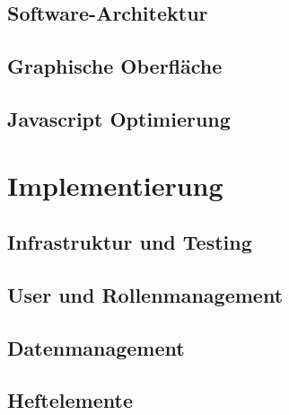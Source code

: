 \documentclass[12pt]{article}
\begin{document}
\subsection{Software-Architektur}
\label{subsec:softwarearchitektur}


\newpage

\subsection{Graphische Oberfläche}
\label{subsec:graphischeoberflaeche}


\newpage

\subsection{Javascript Optimierung}
\label{subsec:javascriptoptimierung}


\newpage %

\section{Implementierung}
\label{sec:implementierung}


\subsection{Infrastruktur und Testing}
\label{subsec:infrastrukturtesting}


\newpage

\subsection{User und Rollenmanagement}
\label{subsec:usermanagement}


\newpage

\subsection{Datenmanagement}
\label{subsec:datenmanagement}


\newpage

\subsection{Heftelemente}
\label{subsec:heftelement}

\end{document}
